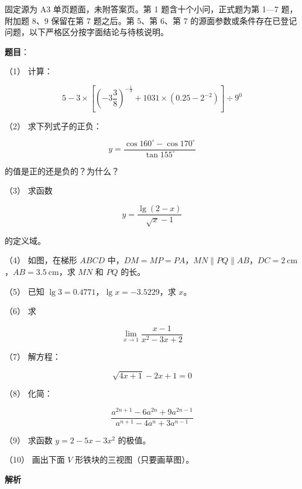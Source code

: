 

\begin{gktip}
固定源为 A3 单页题面，未附答案页。第 1 题含十个小问，正式题为第 1—7 题，附加题 8、9 保留在第 7 题之后。第 5、第 6、第 7 的源面参数或条件存在已登记问题，以下严格区分按字面结论与待核说明。
\end{gktip}

\begin{answer}

\textbf{题目}：

（1） 计算：

\nopagebreak[4]
\[
5-3\times\left[\left(-3\frac38\right)^{-\frac13}+1031\times\left(0.25-2^{-2}\right)\right]\div9^0
\]

（2） 求下列式子的正负：

\nopagebreak[4]
\[
y=\frac{\cos160^\circ-\cos170^\circ}{\tan155^\circ}
\]

的值是正的还是负的？为什么？

（3） 求函数

\nopagebreak[4]
\[
y=\frac{\lg(2-x)}{\sqrt{x}-1}
\]

的定义域。

（4） 如图，在梯形 $ABCD$ 中，$DM=MP=PA$，$MN\parallel PQ\parallel AB$，$DC=2\ \mathrm{cm}$，$AB=3.5\ \mathrm{cm}$，求 $MN$ 和 $PQ$ 的长。
\nopagebreak[4]
\begin{center}\end{center}
\nopagebreak[4]
（5） 已知 $\lg3=0.4771$，$\lg x=-3.5229$，求 $x$。

（6） 求

\nopagebreak[4]
\[
\lim_{x\to1}\frac{x-1}{x^2-3x+2}
\]

（7） 解方程：

\nopagebreak[4]
\[
\sqrt{4x+1}-2x+1=0
\]

（8） 化简：

\nopagebreak[4]
\[
\frac{a^{2n+1}-6a^{2n}+9a^{2n-1}}{a^{n+1}-4a^n+3a^{n-1}}
\]

（9） 求函数 $y=2-5x-3x^2$ 的极值。

（10） 画出下面 $V$ 形铁块的三视图（只要画草图）。
\nopagebreak[4]
\begin{center}\end{center}
\nopagebreak[4]
\textbf{解析}


\end{answer}
